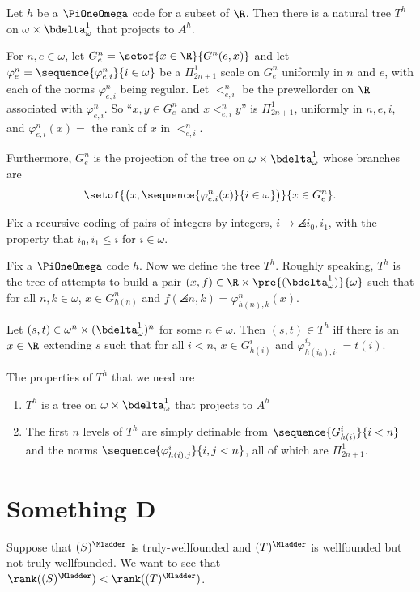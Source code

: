 \documentclass[oneside,12pt]{amsart}
\begin{document}
\begin{definition}
Let $h$ be a $\PiOneOmega$ code for a subset of $\R$.
Then there is a natural tree $T^{h}$ on $\omega\times\bdelta^1_{\omega}$ that projects to $A^h$.

For $n,e\in\omega$, let $G^n_e = \setof{x\in\R}{G^n(e, x)}$ and
let $\varphi^n_e = \sequence{\varphi^n_{e,i}}{i\in\omega}$ be a $\Pi^1_{2n+1}$ scale on $G^n_e$ uniformly in $n$ and $e$,
with each of the norms $\varphi^n_{e,i}$ being regular.
Let $<^n_{e,i}$ be the prewellorder on $\R$ associated with $\varphi^n_{e,i}$. So ``$x,y\in G^n_e$ and $x <^n_{e,i} y$'' is
$\Pi^1_{2n+1}$, uniformly in $n,e,i$, and $\varphi^n_{e,i}(x) = $ the rank of $x$ in $<^n_{e,i}$.

Furthermore, $G^n_e$ is the projection of the tree on $\omega \times \bdelta^1_{\omega}$ whose branches are
$$\setof{\left(x,\sequence{\varphi^n_{e,i}(x)}{i\in\omega}\right)}{x\in G^n_e}.$$

Fix a recursive coding of pairs of integers by integers, $i\to\angles{i_0,i_1}$,
with the property that $i_0,i_1\leq i$ for $i\in\omega$.

Fix a $\PiOneOmega$ code $h$. Now we define the tree $T^h$. Roughly speaking, $T^h$ is the tree of attempts to
build a pair $(x,f) \in \R \times \pre{(\bdelta^1_{\omega})}{\omega}$ such that for all $n,k\in\omega$, $x\in G^n_{h(n)}$
and $f(\angles{n,k}) = \varphi^n_{h(n),k}(x)$.


Let $(s,t) \in \omega^n\times(\bdelta^1_{\omega})^n$ for some $n\in\omega$. Then $(s,t)\in T^h$ iff there is an
$x\in\R$ extending $s$ such that for all $i<n$, $x\in G^i_{h(i)}$ and $\varphi^{i_0}_{h(i_0),i_1} = t(i)$.
\end{definition}

The properties of $T^h$ that we need are
\begin{enumerate}
\item $T^h$ is a tree on $\omega\times\bdelta^1_{\omega}$ that projects to $A^h$
\item The first $n$ levels of $T^h$ are simply definable from $\sequence{G^i_{h(i)}}{i<n}$ and
the norms $\sequence{\varphi^i_{h(i), j}}{i,j<n}$, all of which are $\Pi^1_{2n+1}$.
\end{enumerate}

\section{Something D}
\label{section:somethingd}

Suppose that $(S)^{\Mladder}$ is truly-wellfounded and $(T)^{\Mladder}$ is
wellfounded but not truly-wellfounded. We want to see that
$\rank((S)^{\Mladder}) < \rank((T)^{\Mladder})$.
\end{document}
